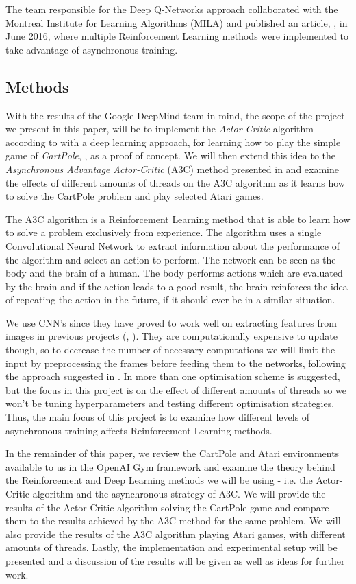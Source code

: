 \documentclass[11pt]{article}
\begin{document}
The team responsible for the Deep Q-Networks approach collaborated with
the Montreal Institute for Learning Algorithms (MILA) and published
an article, \cite{a3c}, in June 2016, where multiple Reinforcement Learning methods were implemented to
take advantage of asynchronous training.

\subsection{Methods}

With the results of the Google DeepMind team in mind, the scope of the project we present in
this paper, will be to implement the \textit{Actor-Critic} algorithm according to \cite{RLbook}
with a deep learning approach, for learning how to play the simple game of \textit{CartPole}, \cite{cart_pole},
as a proof of concept.
We will then extend this idea to the \textit{Asynchronous Advantage Actor-Critic} (A3C)
method presented in \cite{a3c} and examine the effects of different amounts of threads
on the A3C algorithm as it learns how to solve the CartPole problem and play selected Atari games.

The A3C algorithm is a Reinforcement Learning method that is able to learn
how to solve a problem exclusively from experience.
The algorithm uses a single Convolutional Neural Network to extract information
about the performance of the algorithm and select an action to perform.
The network can be seen as the body and the brain of a human.
The body performs actions which are evaluated by the brain and if
the action leads to a good result, the brain reinforces the idea
of repeating the action in the future, if it should ever be in a similar
situation.

We use CNN's since they have proved to work well on extracting features
from images in previous projects (\cite{dqn}, \cite{a3c}).
They are computationally expensive to update though,
so to decrease the number of necessary computations we will limit
the input by preprocessing the frames before feeding them
to the networks, following the approach suggested in \cite{a3c}.
In \cite{a3c} more than one optimisation scheme
is suggested, but the focus in this project is on the effect of
different amounts of threads so we won't be tuning hyperparameters
and testing different optimisation strategies.
Thus, the main focus of this project is to examine how different levels of asynchronous
training affects Reinforcement Learning methods.

In the remainder of this paper, we review the 
CartPole and Atari environments available to us in
the OpenAI Gym framework and examine the theory behind the
Reinforcement and Deep Learning methods we will be using
- i.e. the Actor-Critic algorithm and the asynchronous strategy of A3C.
We will provide the results of the Actor-Critic algorithm
solving the CartPole game and compare them to the results achieved by the A3C method
for the same problem.
We will also provide the results of the A3C algorithm playing Atari games, with different 
amounts of threads. 
Lastly, the implementation and experimental setup will be presented and
a discussion of the results will be given as well as ideas for further
work.
\end{document}
